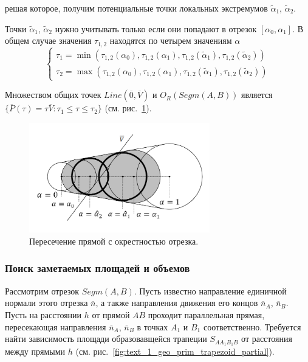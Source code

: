 решая которое, получим потенциальные точки локальных экстремумов $\tilde{\alpha}_1$, $\tilde{\alpha}_2$.

Точки $\tilde{\alpha}_1$, $\tilde{\alpha}_2$ нужно учитывать только если они попадают в отрезок $[\alpha_0, \alpha_1]$.
В общем случае значения $\tau_{1,2}$ находятся по четырем значениям $\alpha$
\begin{equation}
	\left\{
		\begin{aligned}
			\tau_1 = \min(\tau_{1,2}(\alpha_0), \tau_{1,2}(\alpha_1), \tau_{1,2}(\tilde{\alpha}_1), \tau_{1,2}(\tilde{\alpha}_2)) \\
			\tau_2 = \max(\tau_{1,2}(\alpha_0), \tau_{1,2}(\alpha_1), \tau_{1,2}(\tilde{\alpha}_1), \tau_{1,2}(\tilde{\alpha}_2))
		\end{aligned}
	\right.
\end{equation}

Множеством общих точек $Line(\overline{0}, \overline{V})$ и $O_R(Segm(A, B))$ является $\{ \overline{P}(\tau) = \tau \overline{V}: \tau_1 \le \tau \le \tau_2 \}$ (см. рис.~\ref{fig:text_1_geo_prim_spheres_nest_intersection}).

\begin{figure}[ht]
\centering
\includegraphics[width=0.7\textwidth]{./pics/text_1_geo_prim/spheres_nest_intersection.pdf}
\caption{Пересечение прямой с окрестностью отрезка.}
\label{fig:text_1_geo_prim_spheres_nest_intersection}
\end{figure}

\subsubsection{Поиск заметаемых площадей и объемов}\label{sec:text_1_geo_prim_volume}

Рассмотрим отрезок $Segm(A, B)$.
Пусть известно направление единичной нормали этого отрезка $\overline{n}$, а также направления движения его концов $\overline{n}_A$, $\overline{n}_B$.
Пусть на расстоянии $h$ от прямой $AB$ проходит параллельная прямая, пересекающая направления $\overline{n}_A$, $\overline{n}_B$ в точках $A_1$ и $B_1$ соответственно.
Требуется найти зависимость площади образовавщейся трапеции $S_{AA_1B_1B}$ от расстояния между прямыми $h$ (см. рис.~\ref{fig:text_1_geo_prim_trapezoid_partial}).

